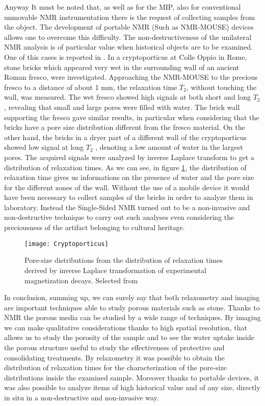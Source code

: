 \documentclass[a4paper,11pt]{report}
\begin{document}
Anyway It must be noted that, as well as for the MIP, also for conventional unmovable NMR instrumentation there is the request of collecting samples from the object. The development of portable NMR (Such as NMR-MOUSE) devices allows one to overcome this difficulty. The non-destructiveness of the unilateral NMR analysis is of particular value when historical objects are to be examined. One of this cases is reported in \cite{seistone}. In a cryptoporticus at Colle Oppio in Rome, stone bricks which appeared very wet in the surrounding wall of an ancient Roman fresco, were investigated. Approaching the NMR-MOUSE to the precious fresco to a distance of about 1 mm,  the relaxation time $T_2$, without touching the wall, was measured. The wet fresco showed high signals at both short and long $T_2$, revealing that small and large pores were filled with water. The brick wall supporting the fresco gave similar results, in particular when considering that the bricks have a pore size distribution different from the fresco material. On the other hand, the bricks in a dryer part of a different wall of the cryptoporticus showed low signal at long $T_2$ , denoting a low amount of water in the largest pores. The acquired signals were analyzed by inverse Laplace transform to get a distribution of relaxation times. As we can see, in figure \ref{Cryptoporticus}, the distribution of relaxation time gives us informations on the presence of water and the pore size for the different zones of the wall. Without the use of a mobile device it would have been necessary to collect samples of the bricks in order to analyze them in laboratory. Instead the Single-Sided NMR turned out to be a non-invasive and non-destructive technique to carry out such analyses even considering the preciousness of the artifact belonging to cultural heritage. 
\begin{figure}[h] 
\centering
\texttt{[image: Cryptoporticus]}
\caption{Pore-size distributions from the distribution of relaxation times derived by inverse Laplace transformation of experimental magnetization decays. Selected from \cite{seistone}} \label{Cryptoporticus}
	\end{figure}
	
In conclusion, summing up, we can surely say that both relaxometry and imaging are important techniques able to study porous materials such as stone. Thanks to NMR the porous media can be studied by a wide range of techniques. By imaging we can make qualitative considerations thanks to high spatial resolution, that allows us to study the porosity of the sample and to see the water uptake inside the porous structure useful to study the effectiveness of protective and consolidating treatments. By relaxometry it was possible to obtain the distribution of relaxation times for the characterization of the pore-size distributions inside the examined sample. Moreover thanks to portable devices, it was also possible to analyze items of high historical value and of any size, directly in situ in a non-destructive and non-invasive way.
\end{document}
